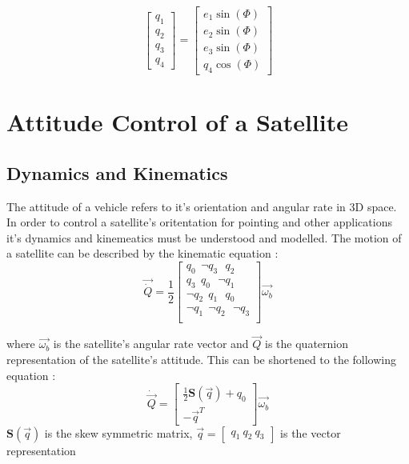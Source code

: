 \begin{equation}
    \begin{bmatrix}
        q_{1} \\ q_{2} \\ q_{3} \\ q_{4}
    \end{bmatrix}
    =
    \begin{bmatrix}
        e_{1}\sin(\Phi) \\ e_{2}\sin(\Phi) \\ e_{3}\sin(\Phi) \\ q_{4}\cos(\Phi)
    \end{bmatrix}
\end{equation}



\section{Attitude Control of a Satellite}
\subsection{Dynamics and Kinematics}
The attitude of a vehicle refers to it's orientation and angular rate in 3D space. In order to control a satellite's
oritentation for pointing and other applications it's dynamics and kinemeatics must be understood and modelled. 
The motion of a satellite can be described by the kinematic equation \cite{sidiAttitudeDynamicsKinematics1997}:
\begin{equation}
    \vec{\dot{Q}}
=\frac{1}{2}
\begin{bmatrix}
q_{0} \ \ \neg q_{3} \ \ \ q_{2} \\ 
q_{3} \ \ q_{0} \ \ \ \neg q_{1} \\ 
\neg q_{2} \ \ q_{1} \ \ \ q_{0} \\ 
\neg q_{1} \ \ \neg q_{2} \ \ \ \neg q_{3} \\
\end{bmatrix} \vec{\omega_{b}}
\end{equation}

where $\vec{\omega_{b}}$ is the satellite's angular rate vector and $\vec{Q}$ is the quaternion representation of the satellite's attitude.
This can be shortened to the following equation \cite{shenActiveFaulttolerantControl2019}:
\begin{equation}
    \dot{\vec{Q}} = 
    \begin{bmatrix}
        \frac{1}{2}\mathbf{S}(\vec{q})+q_{0} \\
        -\vec{q}^T
    \end{bmatrix}
    \vec{\omega_{b}}
\end{equation}
$\mathbf{S}(\vec{q})$ is the skew symmetric matrix, $\vec{q}=\begin{bmatrix}q_{1} \ q_{2} \ q_{3} \end{bmatrix}$ is the vector representation




